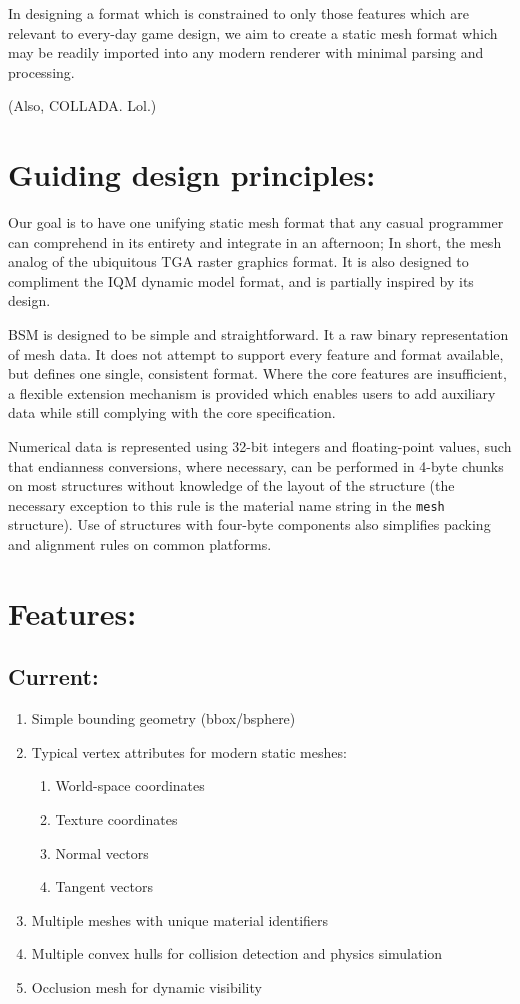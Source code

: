 \documentclass{article}
\begin{document}
In designing a format which is constrained to only those features which are relevant to every-day game design, we aim to create a static mesh format which may be readily imported into any modern renderer with minimal parsing and processing.

{\tiny (Also, COLLADA.  Lol.)}

\section{Guiding design principles:}

Our goal is to have one unifying static mesh format that any casual programmer can comprehend in its entirety and integrate in an afternoon;  In short, the mesh analog of the ubiquitous TGA raster graphics format.  It is also designed to compliment the IQM dynamic model format, and is partially inspired by its design.

BSM is designed to be simple and straightforward.  It a raw binary representation of mesh data.  It does not attempt to support every feature and format available, but defines one single, consistent format.  Where the core features are insufficient, a flexible extension mechanism is provided which enables users to add auxiliary data while still complying with the core specification.

Numerical data is represented using 32-bit integers and floating-point values, such that endianness conversions, where necessary, can be performed in 4-byte chunks on most structures without knowledge of the layout of the structure (the necessary exception to this rule is the material name string in the \texttt{mesh} structure).  Use of structures with four-byte components also simplifies packing and alignment rules on common platforms.


\section{Features:}
\subsection{Current:}
\begin{enumerate}
	\item Simple bounding geometry (bbox/bsphere)
	\item Typical vertex attributes for modern static meshes:
	\begin{enumerate}
		\item World-space coordinates
		\item Texture coordinates
		\item Normal vectors
		\item Tangent vectors
	\end{enumerate}
	\item Multiple meshes with unique material identifiers
	\item Multiple convex hulls for collision detection and physics simulation
	\item Occlusion mesh for dynamic visibility
\end{enumerate}
\end{document}
